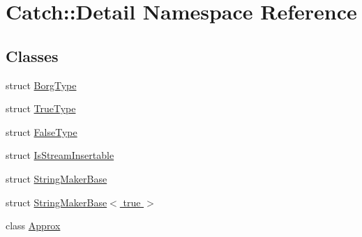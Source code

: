 \hypertarget{namespaceCatch_1_1Detail}{\section{Catch\-:\-:Detail Namespace Reference}
\label{namespaceCatch_1_1Detail}
}
\subsection*{Classes}
\begin{DoxyCompactItemize}
\item 
struct \hyperlink{structCatch_1_1Detail_1_1BorgType}{Borg\-Type}
\item 
struct \hyperlink{structCatch_1_1Detail_1_1TrueType}{True\-Type}
\item 
struct \hyperlink{structCatch_1_1Detail_1_1FalseType}{False\-Type}
\item 
struct \hyperlink{structCatch_1_1Detail_1_1IsStreamInsertable}{Is\-Stream\-Insertable}
\item 
struct \hyperlink{structCatch_1_1Detail_1_1StringMakerBase}{String\-Maker\-Base}
\item 
struct \hyperlink{structCatch_1_1Detail_1_1StringMakerBase_3_01true_01_4}{String\-Maker\-Base$<$ true $>$}
\item 
class \hyperlink{classCatch_1_1Detail_1_1Approx}{Approx}
\end{DoxyCompactItemize}
